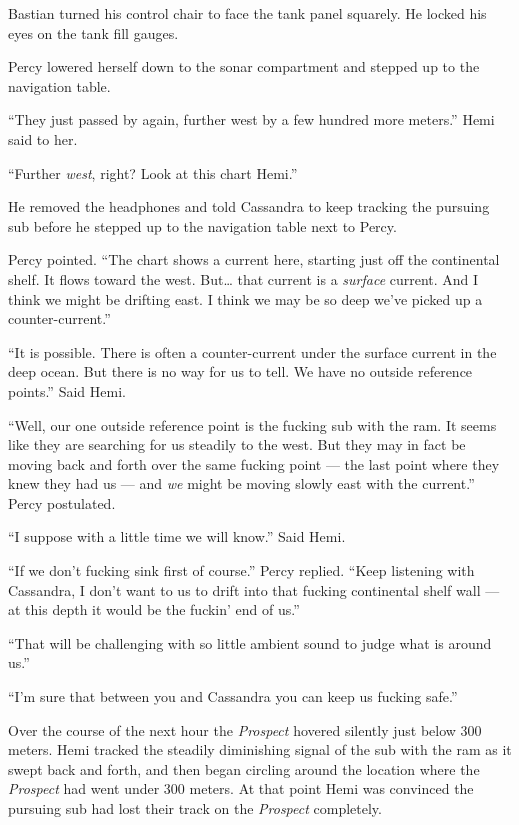 \documentclass[]{scrbook}
\begin{document}
Bastian turned his control chair to face the tank panel squarely. He
locked his eyes on the tank fill gauges.

Percy lowered herself down to the sonar compartment and stepped up to
the navigation table.

``They just passed by again, further west by a few hundred more
meters.'' Hemi said to her.

``Further \emph{west}, right? Look at this chart Hemi.''

He removed the headphones and told Cassandra to keep tracking the
pursuing sub before he stepped up to the navigation table next to Percy.

Percy pointed. ``The chart shows a current here, starting just off the
continental shelf. It flows toward the west. But\ldots{} that current is
a \emph{surface} current. And I think we might be drifting east. I think
we may be so deep we've picked up a counter-current.''

``It is possible. There is often a counter-current under the surface
current in the deep ocean. But there is no way for us to tell. We have
no outside reference points.'' Said Hemi.

``Well, our one outside reference point is the fucking sub with the ram.
It seems like they are searching for us steadily to the west. But they
may in fact be moving back and forth over the same fucking point --- the
last point where they knew they had us --- and \emph{we} might be moving
slowly east with the current.'' Percy postulated.

``I suppose with a little time we will know.'' Said Hemi.

``If we don't fucking sink first of course.'' Percy replied. ``Keep
listening with Cassandra, I don't want to us to drift into that fucking
continental shelf wall --- at this depth it would be the fuckin' end of
us.''

``That will be challenging with so little ambient sound to judge what is
around us.''

``I'm sure that between you and Cassandra you can keep us fucking
safe.''

Over the course of the next hour the \emph{Prospect} hovered silently
just below 300 meters. Hemi tracked the steadily diminishing signal of
the sub with the ram as it swept back and forth, and then began circling
around the location where the \emph{Prospect} had went under 300 meters.
At that point Hemi was convinced the pursuing sub had lost their track
on the \emph{Prospect} completely.
\end{document}
